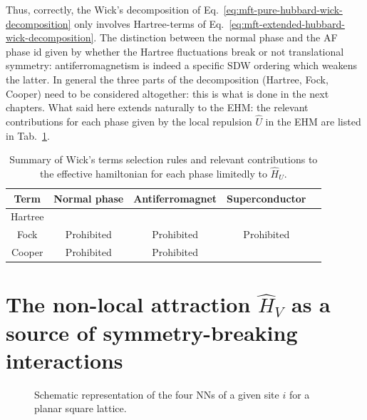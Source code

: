 Thus, correctly, the Wick's decomposition of Eq.~\eqref{eq:mft-pure-hubbard-wick-decomposition} only involves Hartree-terms of Eq.~\eqref{eq:mft-extended-hubbard-wick-decomposition}. The distinction between the normal phase and the AF phase id given by whether the Hartree fluctuations break or not translational symmetry: antiferromagnetism is indeed a specific SDW ordering which weakens the latter. In general the three parts of the decomposition (Hartree, Fock, Cooper) need to be considered altogether: this is what is done in the next chapters. What said here extends naturally to the EHM: the relevant contributions for each phase given by the local repulsion $\hat U$ in the EHM are listed in Tab.~\ref{tab:U-wick-terms-phases}.

\begin{table}
	\centering
	\begin{tabular}{c c c c c}\textbf{Term} & \textbf{Normal phase} & \textbf{Antiferromagnet} & \textbf{Superconductor} \\
		\midrule
		Hartree & & & \\
		Fock & Prohibited & Prohibited & Prohibited \\
		Cooper & Prohibited & Prohibited & \\
		\midrule
	\end{tabular}
	\caption{Summary of Wick's terms selection rules and relevant contributions to the effective hamiltonian for each phase limitedly to $\hat H_U$.}
	\label{tab:U-wick-terms-phases}
\end{table}

\section{The non-local attraction $\hat H_V$ as a source of symmetry-breaking interactions}\label{sec:mft-discussion-non-local-source}

\begin{figure}
	\centering
	
	\caption{Schematic representation of the four NNs of a given site $i$ for a planar square lattice.}
	\label{fig:square-nearest-neighbors}
\end{figure}

